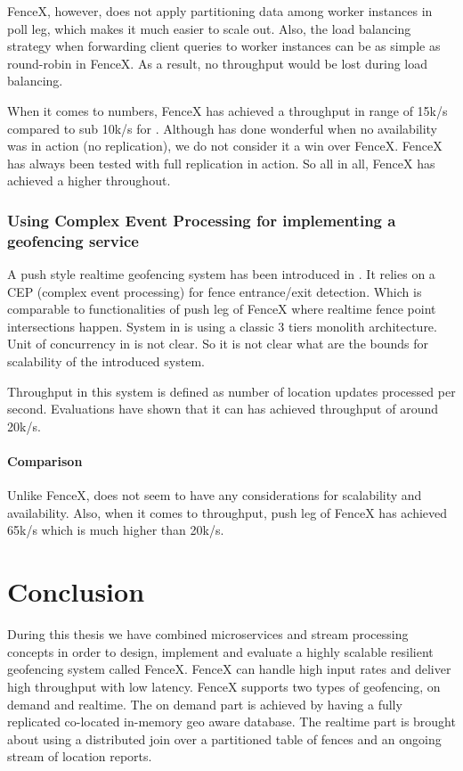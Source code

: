\documentclass[a4]{report}
\begin{document}
    FenceX, however, does not apply partitioning data among worker instances in poll leg, which makes it much easier to
    scale out.
    Also, the load balancing strategy when forwarding client queries to worker instances can be as simple as
    round-robin in FenceX.
    As a result, no throughput would be lost during load balancing.

    When it comes to numbers, FenceX has achieved a throughput in range of 15k/s compared to sub 10k/s for
    \cite{Cirillo-Jacobs-Martin-Szczytowski-2014}.
    Although \cite{Cirillo-Jacobs-Martin-Szczytowski-2014} has done wonderful when no availability was in action
    (no replication), we do not consider it a win over FenceX.
    FenceX has always been tested with full replication in action.
    So all in all, FenceX has achieved a higher throughout.

    \subsection{Using Complex Event Processing for implementing a geofencing service}
    A push style realtime geofencing system has been introduced in \cite{Nechifor_Comnac_2013}.
    It relies on a CEP (complex event processing) for fence entrance/exit detection.
    Which is comparable to functionalities of push leg of FenceX where realtime fence point intersections happen.
    System in \cite{Nechifor_Comnac_2013} is using a classic 3 tiers monolith architecture.
    Unit of concurrency in \cite{Nechifor_Comnac_2013} is not clear.
    So it is not clear what are the bounds for scalability of the introduced system.

    Throughput in this system is defined as number of location updates processed per second.
    Evaluations have shown that it can has achieved throughput of around 20k/s.

    \subsubsection{Comparison}
    Unlike FenceX, \cite{Nechifor_Comnac_2013} does not seem to have any considerations for
    scalability and availability.
    Also, when it comes to throughput, push leg of FenceX has achieved 65k/s which is much higher than 20k/s.


    \chapter{Conclusion}
    During this thesis we have combined microservices and stream processing concepts in order to design, implement
    and evaluate a highly scalable resilient geofencing system called FenceX.
    FenceX can handle high input rates and deliver high throughput with low latency.
    FenceX supports two types of geofencing, on demand and realtime.
    The on demand part is achieved by having a fully replicated co-located in-memory geo aware database.
    The realtime part is brought about using a distributed join over a partitioned table of fences and an ongoing
    stream of location reports.
\end{document}
